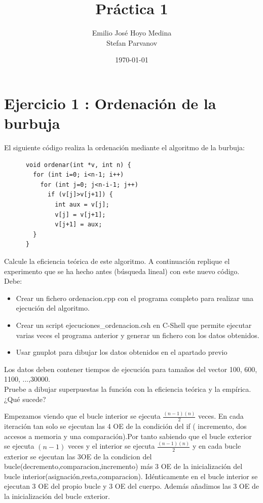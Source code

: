 \documentclass{article}
\begin{document}
\lstset{numbers=left}
      
\title{Práctica 1}
\author{Emilio José Hoyo Medina\\ Stefan Parvanov}
\date{\today}
\maketitle

\section{Ejercicio 1 : Ordenación de la burbuja}
El siguiente código realiza la ordenación mediante el algoritmo de la burbuja:
\begin{lstlisting}
      void ordenar(int *v, int n) {
        for (int i=0; i<n-1; i++)
          for (int j=0; j<n-i-1; j++)
            if (v[j]>v[j+1]) {
              int aux = v[j];
              v[j] = v[j+1];
              v[j+1] = aux;
		} 
      }
\end{lstlisting}

Calcule la eficiencia teórica de este algoritmo. A continuación replique el experimento que se ha hecho antes (búsqueda lineal) con este nuevo código. Debe:
\begin{itemize}
	\item Crear un fichero ordenacion.cpp con el programa completo para realizar una ejecución del algoritmo.
	\item Crear un script ejecuciones\_ordenacion.csh en C-Shell que permite ejecutar varias veces el programa anterior y generar un fichero con los datos obtenidos.
	\item Usar gnuplot para dibujar los datos obtenidos en el apartado previo
\end{itemize}
Los datos deben contener tiempos de ejecución para tamaños del vector 100, 600, 1100, ...,30000. \\
Pruebe a dibujar superpuestas la función con la eficiencia teórica y la empírica. ¿Qué sucede? 
\clearpage


Empezamos viendo que el bucle interior se ejecuta $\frac{(n-1)(n)}{2}$ veces.
En cada iteraci\'on tan solo se ejecutan las 4 OE de la condici\'on del if ( incremento, dos accesos a memoria y una comparaci\'on).Por tanto sabiendo que el bucle exterior se ejecuta $(n-1)$ veces y el interior se ejecuta $\frac{(n-1)(n)}{2}$ y en cada bucle exterior se ejecutan las 3OE de la condicion del bucle(decremento,comparacion,incremento) m\'as 3 OE de la inicializaci\'on del bucle interior(asignaci\'on,resta,comparacion). Id\'enticamente en el bucle interior se ejecutan 3 OE del propio bucle y 3 OE del cuerpo. Adem\'as añadimos las 3 OE de la inicializaci\'on del bucle exterior.
\end{document}
